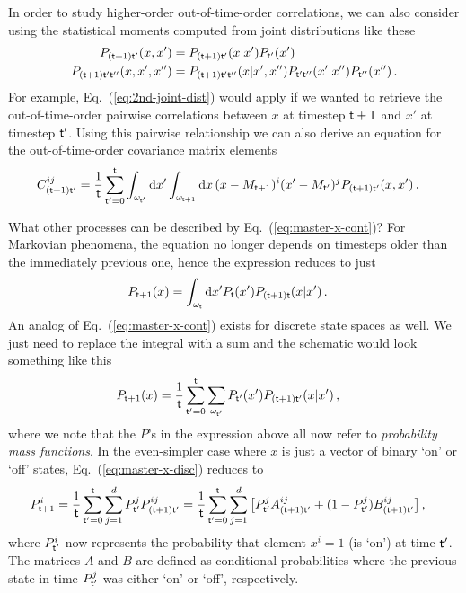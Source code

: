 In order to study higher-order out-of-time-order correlations, we can also consider using the statistical moments computed from joint distributions like these
\begin{align}
P_{({\sf t}+1){\sf t}'}(x, x') &= P_{({\sf t}+1){\sf t}'}(x\vert x')P_{{\sf t}'}(x') \label{eq:2nd-joint-dist}\\
P_{({\sf t}+1){\sf t}'{\sf t}''}(x, x', x'') &= P_{({\sf t}+1){\sf t}'{\sf t}''}(x\vert x', x'')P_{{\sf t}'{\sf t}''}(x'\vert x'')P_{{\sf t}''}(x'') \label{eq:3rd-joint-dist}\,.
\end{align}
For example, Eq.~(\ref{eq:2nd-joint-dist}) would apply if we wanted to retrieve the out-of-time-order pairwise correlations between $x$ at timestep ${\sf t}+1$ and $x'$ at timestep ${\sf t}'$. Using this pairwise relationship we can also derive an equation for the out-of-time-order covariance matrix elements
\begin{align}
C_{({\sf t}+1){\sf t}'}^{ij} &= \frac{1}{{\sf t}}\sum_{{\sf t}'=0}^{{\sf t}}\int_{\omega_{{\sf t}'}}{\rm d}x'\int_{\omega_{{\sf t}+1}}{\rm d}x \,(x-M_{{\sf t}+1})^i(x'-M_{{\sf t}'})^j P_{({\sf t}+1){\sf t}'}(x, x') \label{eq:out-of-time-order-covariance-estimator} \,.
\end{align}

What other processes can be described by Eq.~(\ref{eq:master-x-cont})? For Markovian phenomena, the equation no longer depends on timesteps older than the immediately previous one, hence the expression reduces to just
\begin{align}
P_{{\sf t}+1}(x) &= \int_{\omega_{\sf t}}{\rm d}x' P_{\sf t}(x') P_{({\sf t}+1){\sf t}}(x\vert x') \label{eq:master-x-cont-markov} \,.
\end{align}
An analog of Eq.~(\ref{eq:master-x-cont}) exists for discrete state spaces as well. We just need to replace the integral with a sum and the schematic would look something like this
\begin{align}
P_{{\sf t}+1}(x) &= \frac{1}{{\sf t}}\sum_{{\sf t}'=0}^{\sf t}\sum_{\omega_{{\sf t}'}} P_{{\sf t}'}(x') P_{({\sf t}+1){\sf t}'}(x \vert x') \label{eq:master-x-disc} \,,
\end{align}
where we note that the $P$'s in the expression above all now refer to \emph{probability mass functions}. In the even-simpler case where $x$ is just a vector of binary `on' or `off' states, Eq.~(\ref{eq:master-x-disc}) reduces to
\begin{align}
P^i_{{\sf t}+1} &= \frac{1}{{\sf t}}\sum_{{\sf t}'=0}^{\sf t} \sum_{j=1}^d P^j_{{\sf t}'} P^{ij}_{({\sf t}+1){\sf t}'} = \frac{1}{{\sf t}}\sum_{{\sf t}'=0}^{\sf t} \sum_{j=1}^d \big[ P^j_{{\sf t}'} A^{ij}_{({\sf t}+1){\sf t}'} + (1-P^j_{{\sf t}'}) B^{ij}_{({\sf t}+1){\sf t}'} \big] \label{eq:master-x-disc-binary}\,,
\end{align}
where $P^i_{{\sf t}'}$ now represents the probability that element $x^i=1$ (is `on') at time ${\sf t}'$. The matrices $A$ and $B$ are defined as conditional probabilities where the previous state in time $P^j_{{\sf t}'}$ was either `on' or `off', respectively.

